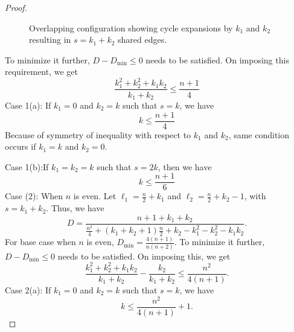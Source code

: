 \begin{proof}
\begin{figure}[htbp]
	\caption{Overlapping configuration showing cycle expansions by $k_1$ and $k_2$ resulting in $s = k_1 + k_2$ shared edges.}
	\label{fig:ch_RA_overlap_case_odd_nodes}
\end{figure}
To minimize it further, $D-D_{\min} \le 0$ needs to be satisfied.
On imposing this requirement, we get 
\begin{equation}
	\frac{k_1^2+k_2^2+k_1k_2}{k_1+k_2} \le \frac{n+1}{4}
\end{equation}
Case 1(a): If $k_1=0$ and $k_2=k$ such that $s=k$, we have
\begin{equation}\label{eq:ch_RA_one_edgeoverlap}
	k \le \frac{n+1}{4}
\end{equation}
Because of symmetry of inequality with respect to $k_1$ and $k_2$, same condition occurs if $k_1=k$ and $k_2=0$.

Case 1(b):If $k_1=k_2=k$ such that $s=2k$, then we have
\begin{equation}\label{eq:ch_RA_equal_edgeoverlap}
	k \le \frac{n+1}{6}
\end{equation}
Case (2): When $n$ is even. Let $\ell_1=\frac{n}{2}+k_1$ and $\ell_2=\frac{n}{2}+k_2-1$, with $s=k_1+k_2$. Thus, we have
\small
\begin{equation*}
	D=\frac{n+1+k_1+k_2}{\frac{n^2}{4}+(k_1+k_2+1)\frac{n}{2}+k_2-k_1^2-k_2^2-k_1k_2}.
\end{equation*}
\normalsize
For base case when $n$ is even, $D_{\min}=\frac{4(n+1)}{n(n+2)}$. To minimize it further, $D-D_{\min} \le 0$ needs to be satisfied.
On imposing this, we get 
\begin{equation}
	\frac{k_1^2+k_2^2+k_1k_2}{k_1+k_2}-\frac{k_2}{k_1+k_2} \le \frac{n^2}{4(n+1)}.
\end{equation}
Case 2(a): If $k_1=0$ and $k_2=k$ such that $s=k$, we have
\begin{equation}
	k \le \frac{n^2}{4(n+1)}+1.
\end{equation}


\end{proof}
